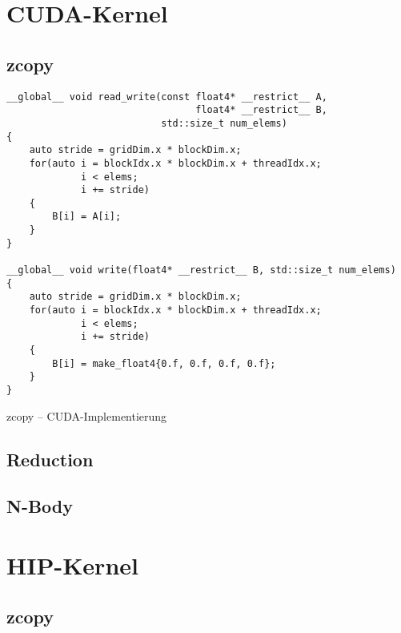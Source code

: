 \appendix

\section{CUDA-Kernel}

\subsection{zcopy}

\begin{code}
    \begin{verbatim}
__global__ void read_write(const float4* __restrict__ A,
                                 float4* __restrict__ B,
                           std::size_t num_elems)
{
    auto stride = gridDim.x * blockDim.x;
    for(auto i = blockIdx.x * blockDim.x + threadIdx.x;
             i < elems;
             i += stride)
    {
        B[i] = A[i];
    }
}

__global__ void write(float4* __restrict__ B, std::size_t num_elems)
{
    auto stride = gridDim.x * blockDim.x;
    for(auto i = blockIdx.x * blockDim.x + threadIdx.x;
             i < elems;
             i += stride)
    {
        B[i] = make_float4{0.f, 0.f, 0.f, 0.f};
    }
}
    \end{verbatim}
    \caption{zcopy -- CUDA-Implementierung}
    \label{anhang:cuda:zcopy}
\end{code}

\subsection{Reduction}

\subsection{N-Body}

\section{HIP-Kernel}

\subsection{zcopy}

